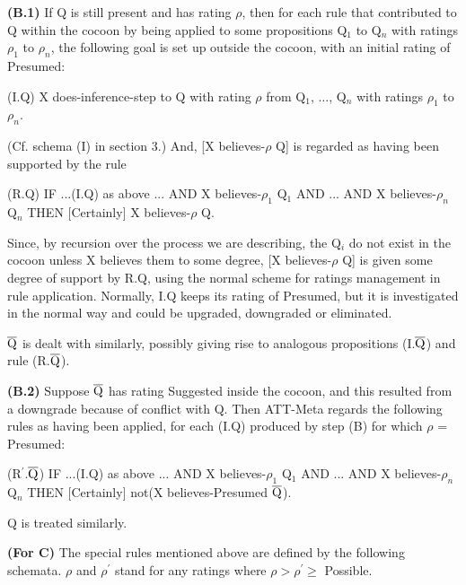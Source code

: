 {\bf (B.1)} If Q is still present and has rating $\rho$, then for each rule that
contributed to Q within the cocoon by being applied to some propositions Q$_1$
to Q$_n$ with ratings $\rho_1$ to $\rho_n$, the following goal is set up
outside the cocoon, with an initial rating of Presumed:

\parindent=25pt
\hang\noindent
(I.Q) X does-inference-step to Q with rating $\rho$ from Q$_1$, $\ldots$, Q$_n$
with ratings $\rho_1$ to $\rho_n$.

\parindent=0pt

(Cf. schema (I) in section 3.)
And, [X believes-$\rho$ Q] is regarded as having been supported 
by the rule

\parindent=25pt
\hang\noindent
(R.Q) IF ...(I.Q) as above ... AND X believes-$\rho_1$ Q$_1$ AND ... AND X believes-$\rho_n$ Q$_n$ 
THEN [Certainly] X believes-$\rho$ Q.

\parindent=0pt

Since, by recursion over the process we are describing, the Q$_i$ do not exist
in the cocoon unless X believes them to some degree, [X believes-$\rho$ Q] is
given some degree of support by R.Q, using the normal scheme for ratings
management in rule application. Normally, I.Q keeps its rating of Presumed, but
it is investigated in the normal way and could be upgraded, downgraded or
eliminated.

$\overline{{\rm Q}}$ is dealt with similarly, possibly giving rise to analogous
propositions (I.$\overline{{\rm Q}}$) and rule (R.$\overline{{\rm Q}}$).

{\bf (B.2)} Suppose $\overline{{\rm Q}}$ has rating Suggested inside the cocoon, and
this resulted from a downgrade because of conflict with Q. Then ATT-Meta
regards the following rules as having been applied, for each (I.Q) produced by
step (B) for which $\rho$ = Presumed:

\parindent=25pt
\hang\noindent
(R$^\prime$.$\overline{{\rm Q}}$) IF ...(I.Q) as above ... AND X
believes-$\rho_1$ Q$_1$ AND ... AND X believes-$\rho_n$ Q$_n$  THEN [Certainly] not(X believes-Presumed $\overline{{\rm Q}}$).

\parindent=0pt

Q is treated similarly.



{\bf (For C)} The special rules mentioned above are defined by the following schemata.
$\rho$ and $\rho^\prime$ stand for any ratings where $\rho > \rho^\prime \ge$ Possible.


